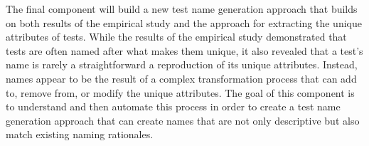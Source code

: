 The final component will build a new test name generation approach that builds on both results of the empirical study and the approach for extracting the unique attributes of tests.
%
While the results of the empirical study demonstrated that tests are often named after what makes them unique, it also revealed that a test's name is rarely a straightforward a reproduction of its unique attributes.
%
Instead, names appear to be the result of a complex transformation process that can add to, remove from, or modify the unique attributes.
%
The goal of this component is to understand and then automate this process in order to create a test name generation approach that can create names that are not only descriptive but also match existing naming rationales.